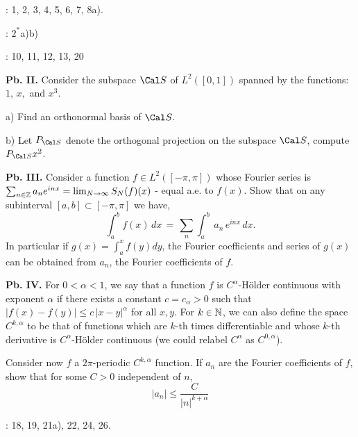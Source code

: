 \bigskip

:  1, 2, 3, 4, 5, 6, 7, 8a).

\bigskip

:   $2^{\ast}$a)b)

\endhead
 
:  10, 11, 12, 13, 20


\medskip

{\bf Pb. II.} Consider the subspace $\Cal S$ of $L^2([0,1])$ spanned by the functions: $1 ,\,  x,$ and  $x^3$. 

a) Find an orthonormal basis of $\Cal S$.

b)  Let $P_{\Cal S}$  denote the orthogonal projection on the subspace $\Cal S$, compute $P_{\Cal S} x^2$.
  
\medskip

{\bf Pb. III.}  Consider  a function $ f \in L^2([-\pi, \pi])$ whose Fourier series is $\sum_{n \in \Bbb Z} a_n e^{inx} = \lim_{N \to \infty} S_N(f)(x)$ - equal a.e. to $f(x)$. 
Show that on any subinterval $[a, b] \subset [-\pi, \pi] $ we have,
$$ \int_a^b f(x)\, dx \, = \, \sum_n   \int_a^b  \, a_n \, e^{i n x} \, dx. $$ In particular if $g(x)= \int_a^x f(y) dy $, the Fourier coefficients and series of $g(x)$ 
can be obtained from $a_n$, the Fourier  coefficients of $f$.

\medskip

{\bf Pb. IV.} For $0 < \alpha < 1$, we say that  a function $f$ is  $C^{\alpha}$-H\"older
continuous with exponent  $\alpha$ if there exists a constant $c=c_{\alpha}>0$ such that $|f(x)- f(y)| \leq c\, | x -y|^{\alpha} $ for all $x, y$. 
For $k \in \Bbb N$, we can also define the space $C^{k, \alpha}$ to be that of functions which are $k$-th times differentiable and whose $k$-th derivative is
$C^{\alpha}$-H\"older continuous (we could relabel $C^{\alpha}$ as $C^{0,\alpha}$). 

Consider now $f$ a $2\pi$-periodic $C^{k, \alpha}$ function. If $a_n$ are the Fourier coefficients of $f$,  show that for some $C>0$ independent of $n$, 
$$ |a_n| \leq \frac{C}{|n|^{k+\alpha} } $$

\bigskip

\endhead

:  18, 19, 21a), 22, 24, 26.


\bigskip

